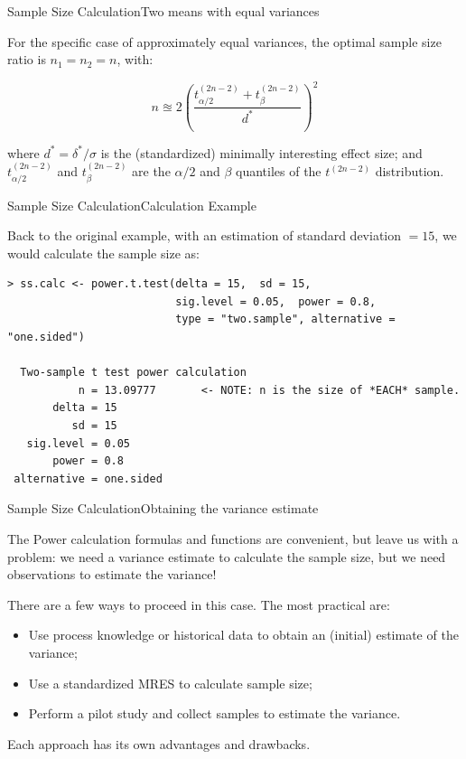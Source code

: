 \begin{frame}{Sample Size Calculation}{Two means with equal variances}

For the specific case of approximately equal variances, the optimal sample size ratio is $n_1 = n_2 = n$, with:

\begin{equation*}
n \approxeq 2\left(\frac{t^{(2n-2)}_{\alpha/2}+t^{(2n-2)}_{\beta}}{d^*}\right)^2
\end{equation*}

where $d^* = \delta^*/\sigma$ is the (standardized) minimally interesting effect size; and $t^{(2n-2)}_{\alpha/2}$ and $t^{(2n-2)}_{\beta}$ are the $\alpha/2$ and $\beta$ quantiles of the $t^{(2n-2 )}$ distribution.\bigskip
\end{frame}

\begin{frame}[fragile]{Sample Size Calculation}{Calculation Example}

Back to the original example, with an estimation of standard deviation $= 15$,
we would calculate the sample size as:

{\smaller
\begin{verbatim}
> ss.calc <- power.t.test(delta = 15,  sd = 15,
                          sig.level = 0.05,  power = 0.8,
                          type = "two.sample", alternative = "one.sided")

  Two-sample t test power calculation
           n = 13.09777       <- NOTE: n is the size of *EACH* sample.
       delta = 15
          sd = 15
   sig.level = 0.05
       power = 0.8
 alternative = one.sided
\end{verbatim}}
\end{frame}


\begin{frame}{Sample Size Calculation}{Obtaining the variance estimate}

The Power calculation formulas and functions are convenient, but leave us
with a problem: we need a variance estimate to calculate the sample size,
but we need observations to estimate the variance!\bigskip

There are a few ways to proceed in this case. The most practical are:

\begin{itemize}
  \item Use process knowledge or historical data to obtain an (initial) estimate of the variance;
  \item Use a standardized MRES to calculate sample size;
  \item Perform a pilot study and collect samples to estimate the variance.
\end{itemize}\bigskip

Each approach has its own advantages and drawbacks.
\end{frame}

